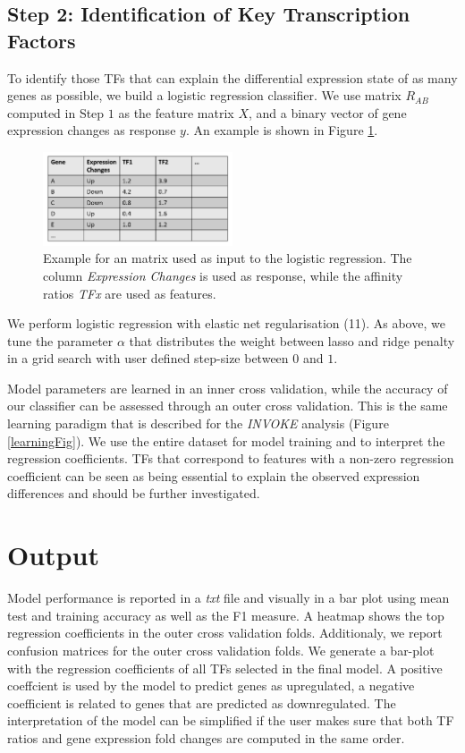 \documentclass{article}
\begin{document}
\subsection*{Step 2: Identification of Key Transcription Factors}
To identify those TFs that can explain the differential expression state of as many genes as possible, we build a logistic regression classifier. 
We use matrix $R_{AB}$ computed in Step $1$ as the feature matrix $X$, and a binary vector of gene expression changes as response $y$. 
An example is shown in Figure \ref{Log-Reg-Example}.
\begin{figure}[h!]
\centering
\includegraphics[width=0.5\textwidth]{Example_Matrix.png}
\caption{Example for an matrix used as input to the logistic regression. The column \textit{Expression Changes} is used as response, while the affinity ratios \textit{TFx} are used as features.}
\label{Log-Reg-Example}
\end{figure}
We perform logistic regression with elastic net regularisation (11).
As above, we tune the parameter $\alpha$ that distributes the weight between lasso and ridge penalty in a grid search with user defined step-size between $0$ and $1$.

Model parameters are learned in an inner cross validation, while the accuracy of our classifier can be assessed through an outer cross validation. This is the
same learning paradigm that is described for the \textit{INVOKE} analysis (Figure \ref{learningFig}). We use the entire dataset for model training and to interpret the regression coefficients.
TFs that correspond to features with a non-zero regression coefficient can be seen as being essential to explain the observed expression differences and should be further investigated.

\section*{Output}
Model performance is reported in a \textit{txt} file and visually in a bar plot using mean test and training accuracy as well as the F1 measure.
A heatmap shows the top regression coefficients in the outer cross validation folds. 
Additionaly, we report confusion matrices for the outer cross validation folds.
We generate a bar-plot with the regression coefficients of all TFs selected in the final model.
A positive coeffcient is used by the model to predict genes as upregulated, a negative coefficient is related to genes that are predicted as downregulated. The interpretation
of the model can be simplified if the user makes sure that both TF ratios and gene expression fold changes are computed in the same order. 
\newpage


\end{document}
